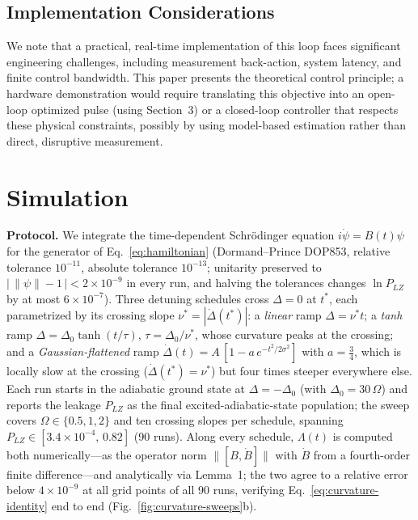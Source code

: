 \documentclass[11pt]{article}
\begin{document}
\subsection{Implementation Considerations}

We note that a practical, real-time implementation of this loop faces significant engineering challenges, including measurement back-action, system latency, and finite control bandwidth. This paper presents the theoretical control principle; a hardware demonstration would require translating this objective into an open-loop optimized pulse (using Section~3) or a closed-loop controller that respects these physical constraints, possibly by using model-based estimation rather than direct, disruptive measurement.

\section{Simulation}
\label{sec:simulation}

\textbf{Protocol.} We integrate the time-dependent Schr\"odinger equation $i\dot{\psi} = B(t)\psi$ for the generator of Eq.~\eqref{eq:hamiltonian} (Dormand--Prince DOP853, relative tolerance $10^{-11}$, absolute tolerance $10^{-13}$; unitarity preserved to $\bigl|\,\|\psi\|-1\,\bigr| < 2\times10^{-9}$ in every run, and halving the tolerances changes $\ln P_{LZ}$ by at most $6\times10^{-7}$). Three detuning schedules cross $\Delta = 0$ at $t^*$, each parametrized by its crossing slope $\nu^* = |\dot{\Delta}(t^*)|$: a \emph{linear} ramp $\Delta = \nu^* t$; a \emph{tanh} ramp $\Delta = \Delta_0\tanh(t/\tau)$, $\tau = \Delta_0/\nu^*$, whose curvature peaks at the crossing; and a \emph{Gaussian-flattened} ramp $\dot{\Delta}(t) = A\,[1 - a\,e^{-t^2/2\sigma^2}]$ with $a = \tfrac34$, which is locally slow at the crossing ($\dot{\Delta}(t^*) = \nu^*$) but four times steeper everywhere else. Each run starts in the adiabatic ground state at $\Delta = -\Delta_0$ (with $\Delta_0 = 30\,\Omega$) and reports the leakage $P_{LZ}$ as the final excited-adiabatic-state population; the sweep covers $\Omega \in \{0.5, 1, 2\}$ and ten crossing slopes per schedule, spanning $P_{LZ} \in [3.4\times10^{-4},\, 0.82]$ (90 runs). Along every schedule, $\Lambda(t)$ is computed both numerically---as the operator norm $\|[B, \dot{B}]\|$ with $\dot{B}$ from a fourth-order finite difference---and analytically via Lemma~1; the two agree to a relative error below $4\times10^{-9}$ at all grid points of all 90 runs, verifying Eq.~\eqref{eq:curvature-identity} end to end (Fig.~\ref{fig:curvature-sweeps}b).
\end{document}

